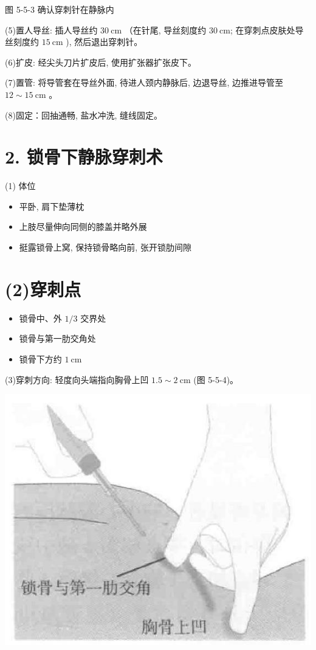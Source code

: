 \documentclass[10pt]{article}
\begin{document}
图 5-5-3 确认穿刺针在静脉内

(5)置人导丝: 插人导丝约 $30 \mathrm{~cm}$ （在针尾, 导丝刻度约 $30 \mathrm{~cm}$; 在穿刺点皮肤处导丝刻度约 $15 \mathrm{~cm}$ ), 然后退出穿刺针。

(6)扩皮: 经尖头刀片扩皮后, 使用扩张器扩张皮下。

(7)置管: 将导管套在导丝外面, 待进人颈内静脉后, 边退导丝, 边推进导管至 $12 \sim 15 \mathrm{~cm}$ 。

(8)固定：回抽通畅, 盐水冲洗, 缝线固定。

\section*{2. 锁骨下静脉穿刺术}
(1) 体位

\begin{itemize}
  \item 平卧, 肩下垫薄枕
  \item 上肢尽量伸向同侧的膝盖并略外展
  \item 挺露锁骨上窝, 保持锁骨略向前, 张开锁肋间隙
\end{itemize}

\section*{(2)穿刺点}
\begin{itemize}
  \item 锁骨中、外 $1 / 3$ 交界处
  \item 锁骨与第一肋交角处
  \item 锁骨下方约 $1 \mathrm{~cm}$
\end{itemize}

(3)穿刺方向: 轻度向头端指向胸骨上凹 $1.5 \sim 2 \mathrm{~cm}$ (图 5-5-4)。

\begin{center}
\includegraphics[max width=\textwidth]{2024_07_05_645bb794a4d4f32ee0c8g-305}
\end{center}
\end{document}
